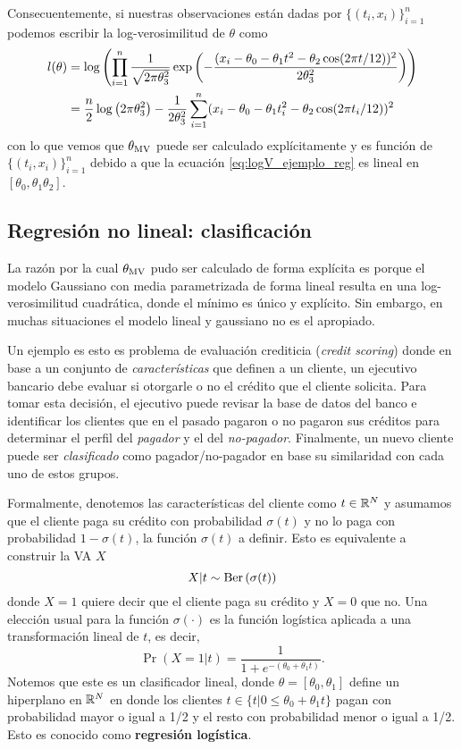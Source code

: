 Consecuentemente, si nuestras observaciones están dadas por $\{(t_i,x_i)\}_{i=1}^n$ podemos escribir la log-verosimilitud de $\theta$ como 
\begin{align}
	\label{eq:logV_ejemplo_reg}
	l(\theta) 	&=\log\left(\prod_{i=1}^n \frac{1}{\sqrt{2\pi\theta_3^2}}\exp\left(-\frac{(x_i-\theta_0 - \theta_1 t^2 - \theta_2\cos(2\pi t/12))^2}{2\theta_3^2}\right)\right)\nonumber \\
	&=\frac{n}{2}\log\left(2\pi\theta_3^2\right)  - \frac{1}{2\theta_3^2}\sum_{i=1}^n (x_i - \theta_0 - \theta_1 t_i^2 - \theta_2\cos(2\pi t_i/12))^2
\end{align}
con lo que vemos que ${\theta_\text{MV}}$ puede ser calculado explícitamente y es función de $\{(t_i,x_i)\}_{i=1}^n$ debido a que la ecuación \ref{eq:logV_ejemplo_reg} es lineal en $[\theta_0,\theta_1\theta_2]$.



\subsection{Regresión no lineal: clasificación} 
\label{sub:clasif}

La razón por la cual ${\theta_\text{MV}}$ pudo ser calculado de forma explícita es porque el modelo Gaussiano con media parametrizada de forma lineal resulta en una log-verosimilitud cuadrática, donde el mínimo es único y explícito. Sin embargo, en muchas situaciones el modelo lineal y gaussiano no es el apropiado. 

Un ejemplo es esto es problema de evaluación crediticia (\textit{credit scoring}) donde en base a un conjunto de \textit{características} que definen a un cliente, un ejecutivo bancario debe evaluar si otorgarle o no el crédito que el cliente solicita. Para tomar esta decisión, el ejecutivo puede revisar la base de datos del banco e identificar los clientes que en el pasado pagaron o no pagaron sus créditos para determinar el perfil del \textit{pagador} y el del \textit{no-pagador}. Finalmente, un nuevo cliente puede ser \textit{clasificado} como pagador/no-pagador en base su similaridad con cada uno de estos grupos. 

Formalmente, denotemos las características del cliente como $t\in{\mathbb R}^N$ y asumamos que el cliente paga su crédito con probabilidad $\sigma(t)$ y no lo paga con probabilidad $1- \sigma(t)$, la función $\sigma(t)$ a definir. Esto es equivalente a construir la VA $X$
\begin{equation}
 	X|t \sim \text{Ber}\left(\sigma(t)\right)
 \end{equation} 
 donde $X=1$ quiere decir que el cliente paga su crédito y $X=0$ que no. Una elección usual para la función $\sigma(\cdot)$ es la función logística aplicada a una transformación lineal de $t$, es decir, 
 \begin{equation}
 	\Pr{(X=1|t)} = \frac{1}{1+e^{-(\theta_0 + \theta_1 t)	}}.
 \end{equation}
Notemos que este es un clasificador lineal, donde $\theta = [\theta_0, \theta_1]$ define un hiperplano en ${\mathbb R}^N$ en donde los clientes $t\in\{t | 0\leq \theta_0 + \theta_1 t\}$ pagan con probabilidad mayor o igual a 1/2 y el resto con probabilidad menor o igual a 1/2. Esto es conocido como \textbf{regresión logística}. 

